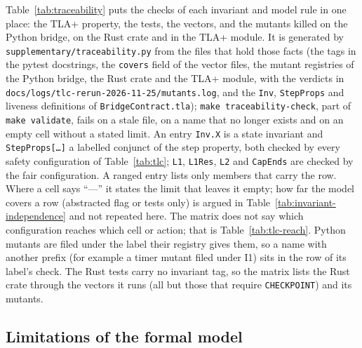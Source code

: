 Table~\ref{tab:traceability} puts the checks of each invariant and model
rule in one place: the TLA+ property, the tests, the vectors, and the
mutants killed on the Python bridge, on the Rust crate and in the TLA+
module. It is generated by \texttt{supplementary/traceability.py} from the
files that hold those facts (the tags in the pytest docstrings, the
\texttt{covers} field of the vector files, the mutant registries of the Python bridge, the Rust crate and the TLA+ module, with
the verdicts in \texttt{docs/logs/tlc-rerun-2026-11-25/mutants.log}, and the
\texttt{Inv}, \texttt{StepProps} and liveness definitions of
\texttt{BridgeContract.tla}); \texttt{make traceability-check}, part of
\texttt{make validate}, fails on a stale file, on a name that no longer
exists and on an empty cell without a stated limit. An entry
\texttt{Inv.X} is a state invariant and \texttt{StepProps[\ldots]} a
labelled conjunct of the step property, both checked by every safety
configuration of Table~\ref{tab:tlc}; \texttt{L1}, \texttt{L1Res}, \texttt{L2} and
\texttt{CapEnds} are checked by the fair configuration. A ranged entry lists
only members that carry the row. Where a cell says ``---'' it states the
limit that leaves it empty; how far the model covers a row (abstracted flag
or tests only) is argued in Table~\ref{tab:invariant-independence} and not
repeated here. The matrix does not say which configuration reaches which
cell or action; that is Table~\ref{tab:tlc-reach}. Python mutants are filed
under the label their registry gives them, so a name with another prefix
(for example a timer mutant filed under I1) sits in the row of its label's
check. The Rust tests carry no invariant tag, so the matrix lists the Rust
crate through the vectors it runs (all but those that require
\texttt{CHECKPOINT}) and its mutants.



\subsection{Limitations of the formal model}
\label{app:formal-limitations}

